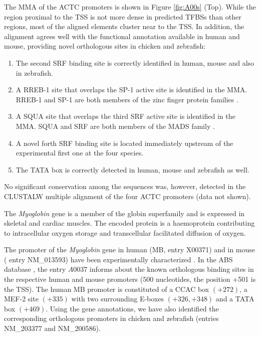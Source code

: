 The MMA of the ACTC promoters is shown in Figure \ref{fig:A00s} (Top). While the region proximal 
to the TSS is not more dense in predicted TFBSs than other regions, most of the 
aligned elements cluster near to the TSS. In addition, the alignment agrees 
well with the functional annotation available in human and mouse, providing
novel orthologous sites in chicken and zebrafish:

\begin{enumerate}
\item
The second SRF binding site is correctly identified in human, mouse and 
also in zebrafish. 
\item
A RREB-1 site that overlaps the SP-1 active site is identified in the MMA. RREB-1
and SP-1 are both members of the zinc finger protein families \citep{vlieghe:2006a}.
\item
A SQUA site that overlaps the third SRF active site is identified in the MMA.
SQUA and SRF are both members of the MADS family \citep{vlieghe:2006a}.
\item
A novel forth SRF binding site is located immediately upstream of the experimental 
first one at the four species. 
\item
The TATA box is correctly detected in human, mouse and zebrafish as well.
\end{enumerate}

No significant conservation among the sequences was, however, detected in the CLUSTALW multiple 
alignment of the four ACTC promoters (data not shown).


The \emph{Myoglobin} gene is a member of the globin superfamily and is expressed in 
skeletal and cardiac muscles. The encoded protein is a haemoprotein contributing to 
intracellular oxygen storage and transcellular facilitated diffusion of oxygen.

The promoter of the \emph{Myoglobin} gene in human (MB, \genbank{} entry X00371)
and in mouse ( entry NM\_013593) have been experimentally characterized
\citep{bassel:1992a,wasserman:1998a}. In the ABS database \citep{blanco:2006a}, the 
entry $A0037$ informs about the known orthologous binding sites in the respective human 
and mouse promoters ($500$ nucleotides, the position +501 is the TSS).
The human MB promoter is constituted of a CCAC box $(+272)$, a MEF-2 site $(+335)$ with two 
surrounding E-boxes $(+326, +348)$ and a TATA box $(+469)$.
Using the  gene annotations, we have also identified the 
corresponding orthologous promoters in chicken and zebrafish ( entries 
NM\_203377 and NM\_200586).

